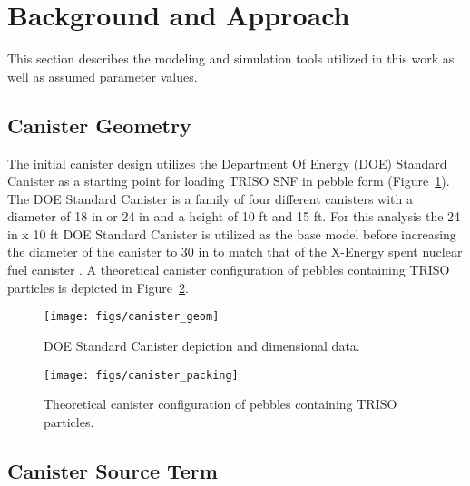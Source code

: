 \documentclass{anstrans}
\begin{document}
\section{Background and Approach}

This section describes the modeling and simulation tools utilized in this work as well as assumed parameter values.

\subsection{Canister Geometry}

The initial canister design utilizes the Department Of Energy (DOE) Standard Canister \cite{doe_canister} as a starting point for loading TRISO SNF in pebble form (Figure~\ref{fig:canister_geom}).
The DOE Standard Canister is a family of four different canisters with a diameter of 18 in or 24 in and a height of 10 ft and 15 ft.
For this analysis the 24 in x 10 ft DOE Standard Canister is utilized as the base model before increasing the diameter of the canister to 30 in to match that of the X-Energy spent nuclear fuel canister \cite{xenergy}.
A theoretical canister configuration of pebbles containing TRISO particles is depicted in Figure~\ref{fig:canister_packing}.
\begin{figure}[ht] %
  \centering
  \texttt{[image: figs/canister\_geom]}
  \caption{DOE Standard Canister depiction and dimensional data.}
  \label{fig:canister_geom}
\end{figure}
\begin{figure}[ht] %
  \centering
  \texttt{[image: figs/canister\_packing]}
  \caption{Theoretical canister configuration of pebbles containing TRISO particles.}
  \label{fig:canister_packing}
\end{figure}

\subsection{Canister Source Term}
\end{document}

